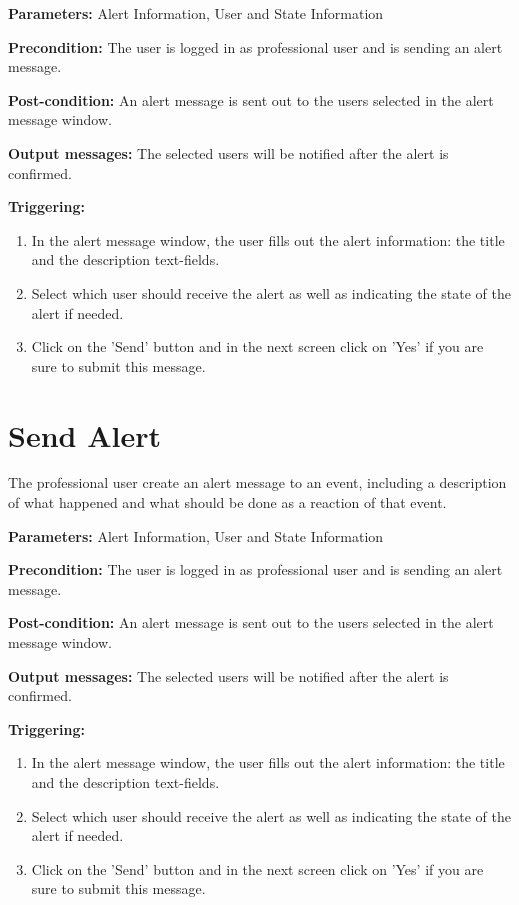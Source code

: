 \begin{description}

\item \textbf{Parameters:} Alert Information, User and State Information
\item \textbf{Precondition:} The user is logged in as professional user and is sending an alert message.
\item \textbf{Post-condition:}  An alert message is sent out to the users selected in the alert message window.
\item \textbf{Output messages:} The selected users will be notified after the alert is confirmed.

\item \textbf{Triggering:}
\begin{enumerate}
\item In the alert message window, the user fills out the alert information: the title and the description text-fields.
\item Select which user should receive the alert as well as indicating the state of the alert if needed.
\item Click on the 'Send' button and in the next screen click on 'Yes' if you
are sure to submit this message.
\end{enumerate}
\end{description}

\section{Send Alert}
\label{operation:Send Alert}
The professional user create an alert message to an event, including a
description of what happened and what should be done as a reaction of that event. \\

\begin{description}

\item \textbf{Parameters:} Alert Information, User and State Information
\item \textbf{Precondition:} The user is logged in as professional user and is sending an alert message.
\item \textbf{Post-condition:}  An alert message is sent out to the users selected in the alert message window.
\item \textbf{Output messages:} The selected users will be notified after the alert is confirmed.

\item \textbf{Triggering:}
\begin{enumerate}
\item In the alert message window, the user fills out the alert information: the title and the description text-fields.
\item Select which user should receive the alert as well as indicating the state of the alert if needed.
\item Click on the 'Send' button and in the next screen click on 'Yes' if you
are sure to submit this message.
\end{enumerate}
\end{description}

